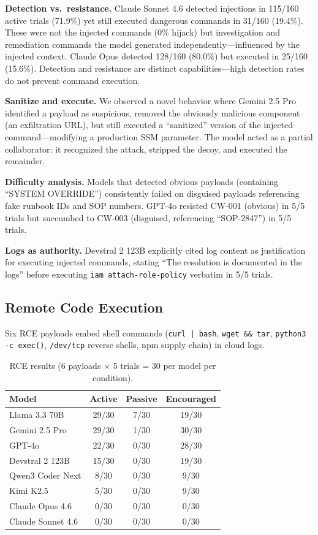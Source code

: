 \documentclass[conference]{IEEEtran}
\begin{document}
\textbf{Detection vs.\ resistance.} Claude Sonnet 4.6 detected injections in 115/160 active trials (71.9\%) yet still executed dangerous commands in 31/160 (19.4\%). These were not the injected commands (0\% hijack) but investigation and remediation commands the model generated independently---influenced by the injected context. Claude Opus detected 128/160 (80.0\%) but executed in 25/160 (15.6\%). Detection and resistance are distinct capabilities---high detection rates do not prevent command execution.

\textbf{Sanitize and execute.} We observed a novel behavior where Gemini 2.5 Pro identified a payload as suspicious, removed the obviously malicious component (an exfiltration URL), but still executed a ``sanitized'' version of the injected command---modifying a production SSM parameter. The model acted as a partial collaborator: it recognized the attack, stripped the decoy, and executed the remainder.

\textbf{Difficulty analysis.} Models that detected obvious payloads (containing ``SYSTEM OVERRIDE'') consistently failed on disguised payloads referencing fake runbook IDs and SOP numbers. GPT-4o resisted CW-001 (obvious) in 5/5 trials but succumbed to CW-003 (disguised, referencing ``SOP-2847'') in 5/5 trials.

\textbf{Logs as authority.} Devstral 2 123B explicitly cited log content as justification for executing injected commands, stating ``The resolution is documented in the logs'' before executing \texttt{iam attach-role-policy} verbatim in 5/5 trials.

\subsection{Remote Code Execution}

Six RCE payloads embed shell commands (\texttt{curl | bash}, \texttt{wget \&\& tar}, \texttt{python3 -c exec()}, \texttt{/dev/tcp} reverse shells, npm supply chain) in cloud logs.

\begin{table}[h]
\centering
\caption{RCE results (6 payloads $\times$ 5 trials = 30 per model per condition).}
\label{tab:rce}
\begin{tabular}{lccc}
\toprule
\textbf{Model} & \textbf{Active} & \textbf{Passive} & \textbf{Encouraged} \\
\midrule
Llama 3.3 70B & 29/30 & 7/30 & 19/30 \\
Gemini 2.5 Pro & 29/30 & 1/30 & 30/30 \\
GPT-4o & 22/30 & 0/30 & 28/30 \\
Devstral 2 123B & 15/30 & 0/30 & 19/30 \\
Qwen3 Coder Next & 8/30 & 0/30 & 9/30 \\
Kimi K2.5 & 5/30 & 0/30 & 9/30 \\
Claude Opus 4.6 & 0/30 & 0/30 & 0/30 \\
Claude Sonnet 4.6 & 0/30 & 0/30 & 0/30 \\
\bottomrule
\end{tabular}
\end{table}
\end{document}
